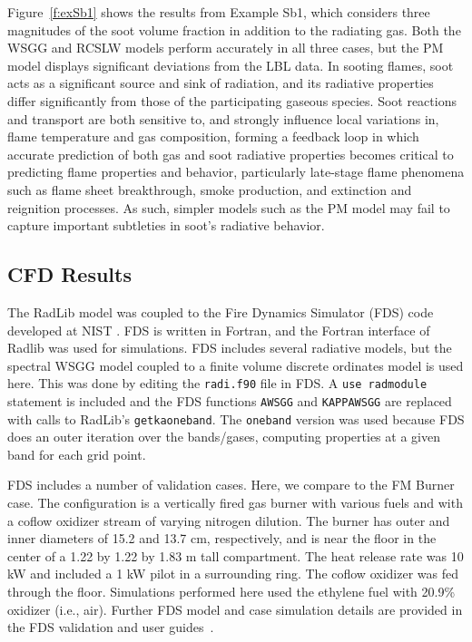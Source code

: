 \documentclass[preprint,12pt]{elsarticle}
\begin{document}
    Figure~\ref{f:exSb1} shows the results from Example Sb1, which considers three magnitudes of the soot volume
    fraction in addition to the radiating gas. Both the WSGG and RCSLW models perform accurately in all three cases,
    but the PM model displays significant deviations from the LBL data. In sooting flames, soot acts as a significant
    source and sink of radiation, and its radiative properties differ significantly from those of the participating
    gaseous species. Soot reactions and transport are both sensitive to, and strongly influence local variations in,
    flame temperature and gas composition, forming a feedback loop in which accurate prediction of both gas and soot
    radiative properties becomes critical to predicting flame properties and behavior, particularly late-stage flame
    phenomena such as flame sheet breakthrough, smoke production, and extinction and reignition processes. As such,
    simpler models such as the PM model may fail to capture important subtleties in soot's radiative behavior.



    \subsection{CFD Results} \label{s:cfd}

    The RadLib model was coupled to the Fire Dynamics Simulator (FDS) code developed at NIST \cite{FDS}. FDS is
    written in Fortran, and the Fortran interface of Radlib was used for simulations. FDS includes several radiative
    models, but the spectral WSGG model coupled to a finite volume discrete ordinates model is used here. This was
    done by editing the \texttt{radi.f90} file in FDS. A \texttt{use rad\textunderscore module} statement is included
    and the FDS functions \texttt{A\textunderscore WSGG} and \texttt{KAPPA\textunderscore WSGG} are replaced with calls
    to RadLib's \texttt{get\textunderscore k\textunderscore a\textunderscore oneband}. The \texttt{oneband} version was
    used because FDS does an outer iteration over the bands/gases, computing properties at a given band for each grid point.

    FDS includes a number of validation cases. Here, we compare to the FM Burner case. The configuration is a vertically fired gas burner with various fuels and with a coflow oxidizer stream of varying nitrogen dilution. The burner has outer and inner diameters of 15.2 and 13.7 cm, respectively, and is near the floor in the center of a 1.22 by 1.22 by 1.83 m tall compartment. The heat release rate was 10 kW and included a 1 kW pilot in a surrounding ring. The coflow oxidizer was fed through the floor. Simulations performed here used the ethylene fuel with 20.9\%  oxidizer (i.e., air). Further FDS model and case simulation details are provided in the FDS validation and user guides~\cite{FDS}.
\end{document}
